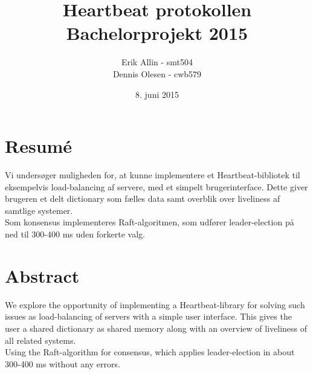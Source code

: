 \documentclass[a4paper,12pt]{article}
\title{Heartbeat protokollen \\ Bachelorprojekt 2015}
\author{Erik Allin - smt504 \\ Dennis Olesen - cwb579}
\date{8. juni 2015}
\begin{document}
\maketitle
\newpage
\renewcommand*\contentsname{Indholdsfortegnelse}
\tableofcontents
\newpage
\clearpage

\section{Resumé}
Vi undersøger muligheden for, at kunne implementere et Heartbeat-bibliotek til eksempelvis load-balancing af servere, med et simpelt brugerinterface. Dette giver brugeren et delt dictionary som fælles data samt overblik over liveliness af samtlige systemer.
\\
Som konsensus implementeres Raft-algoritmen, som udfører leader-election på ned til 300-400 ms uden forkerte valg. 

\section{Abstract}
We explore the opportunity of implementing a Heartbeat-library for solving such issues as load-balancing of servers with a simple user interface. This gives the user a shared dictionary as shared memory along with an overview of liveliness of all related systems.
\\
Using the Raft-algorithm for consensus, which applies leader-election in about 300-400 ms without any errors.
\newpage
\end{document}
